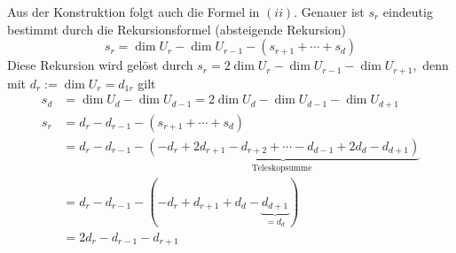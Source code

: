 {    Aus der Konstruktion folgt auch die Formel in $(ii)$. Genauer ist $s_{r}$ eindeutig bestimmt
    durch die Rekursionsformel (absteigende Rekursion)
    \[
    s_{r}=\operatorname{dim} U_{r}-\operatorname{dim} U_{r-1}-\left(s_{r+1}+\cdots+s_{d}\right)
    \]
    Diese Rekursion wird gelöst durch $s_{r}=2 \operatorname{dim} U_{r}-\operatorname{dim}
    U_{r-1}-\operatorname{dim} U_{r+1},$ denn mit $d_{r}:=\operatorname{dim} U_{r}=d_{1 r}$
    gilt
    \[
    \begin{aligned}
    s_{d} &=\operatorname{dim} U_{d}-\operatorname{dim} U_{d-1}=2 \operatorname{dim}
    U_{d}-\operatorname{dim} U_{d-1}-\operatorname{dim} U_{d+1} \\
    s_{r} &=d_{r}-d_{r-1}-\left(s_{r+1}+\cdots+s_{d}\right) \\
    &=d_{r}-d_{r-1}-\underbrace{\left(-d_{r}+2 d_{r+1}-d_{r+2}+\cdots-d_{d-1}+2
    d_{d}-d_{d+1}\right)}_{\text {Teleskopsumme }} \\
    &=d_{r}-d_{r-1}-(-d_{r}+d_{r+1}+d_{d}-\underbrace{d_{d+1}}_{=d_{d}}) \\
    &=2 d_{r}-d_{r-1}-d_{r+1}
    \end{aligned}
    \]
}


\vspace{1\baselineskip}

